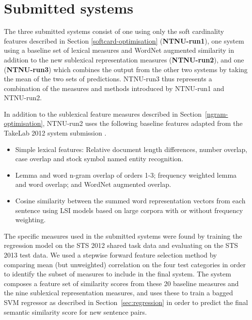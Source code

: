 
\section{Submitted systems}
\label{sec:systems}

The three submitted systems consist of one using only the soft cardinality features 
described in Section \ref{softcard-optimisation} ({\bf NTNU-run1}), 
one system using a baseline set of lexical measures and WordNet augmented similarity 
in addition to the new sublexical representation measures ({\bf NTNU-run2}), 
and one ({\bf NTNU-run3}) which combines the output from the other two systems 
by taking the mean of the two sets of predictions. 
NTNU-run3 thus represents a combination of the measures and methods introduced by NTNU-run1 and NTNU-run2.

In addition to the sublexical feature measures described in Section~\ref{ngram-optimisation},
NTNU-run2 uses the following baseline features adapted from the TakeLab 2012 system 
submission \cite{saric2012takelab}.

\begin{itemize}
\item Simple lexical features: Relative document length differences, number overlap, case overlap and stock symbol named entity recognition.
\item Lemma and word n-gram overlap of orders 1-3;
frequency weighted lemma and word overlap; and
WordNet augmented overlap.
\item Cosine similarity between the summed word representation vectors from each sentence using LSI models based on large corpora with or without frequency weighting.
\end{itemize}

The specific measures used in the submitted systems were found by training the regression model on the STS 2012 shared task data and evaluating on the STS 2013 test data. We used a stepwise forward feature selection method by comparing mean (but unweighted) correlation on the four test categories in order to identify the subset of measures to include in the final system.
%
The system composes a feature set of similarity scores from these 20 baseline measures and the nine sublexical representation measures, and uses these to train a bagged SVM regressor as described in Section~\ref{sec:regression} in order to predict the final semantic similarity score for new sentence pairs.


